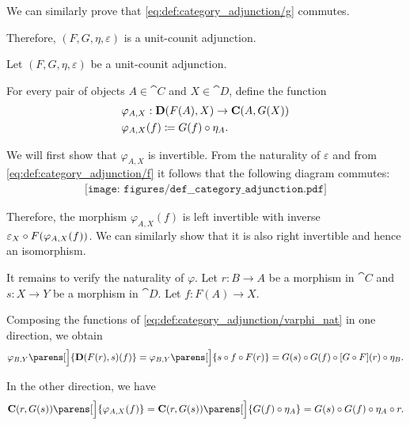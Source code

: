 \begin{defproof}
  We can similarly prove that \eqref{eq:def:category_adjunction/g} commutes.

  Therefore, \( (F, G, \eta, \varepsilon) \) is a unit-counit adjunction.

   Let \( (F, G, \eta, \varepsilon) \) be a unit-counit adjunction.

  For every pair of objects \( A \in \cat{C} \) and \( X \in \cat{D} \), define the function
  \begin{equation*}
    \begin{aligned}
      &\varphi_{A,X}: \cat{D}(F(A), X) \to \cat{C}(A, G(X)) \\
      &\varphi_{A,X}(f) \coloneqq G(f) \bincirc \eta_A.
    \end{aligned}
  \end{equation*}

  We will first show that \( \varphi_{A,X} \) is invertible. From the naturality of \( \varepsilon \) and from \eqref{eq:def:category_adjunction/f} it follows that the following diagram commutes:
  \begin{equation}\label{eq:def:category_adjunction/varphi_inverse_def}
    \begin{aligned}
      \texttt{[image: figures/def\_\_category\_adjunction.pdf]}
    \end{aligned}
  \end{equation}

  Therefore, the morphism \( \varphi_{A,X}(f) \) is left invertible with inverse \( \varepsilon_X \bincirc F(\varphi_{A,X}(f)) \). We can similarly show that it is also right invertible and hence an isomorphism.

  It remains to verify the naturality of \( \varphi \). Let \( r: B \to A \) be a morphism in \( \cat{C} \) and \( s: X \to Y \) be a morphism in \( \cat{D} \). Let \( f: F(A) \to X \).

  Composing the functions of \eqref{eq:def:category_adjunction/varphi_nat} in one direction, we obtain
  \begin{equation}\label{eq:def:category_adjunction/varphi_nat_chase_right}
    \varphi_{B, Y}\parens[\Big]{ \cat{D}(F(r), s)(f) }
    =
    \varphi_{B, Y}\parens[\Big]{ s \bincirc f \bincirc F(r) }
    =
    G(s) \bincirc G(f) \bincirc [G \bincirc F](r) \bincirc \eta_B.
  \end{equation}

  In the other direction, we have
  \begin{equation}\label{eq:def:category_adjunction/varphi_nat_chase_down}
    \cat{C}(r, G(s))\parens[\Big]{ \varphi_{A, X}(f) }
    =
    \cat{C}(r, G(s))\parens[\Big]{ G(f) \bincirc \eta_A }
    =
    G(s) \bincirc G(f) \bincirc \eta_A \bincirc r.
  \end{equation}


\end{defproof}
